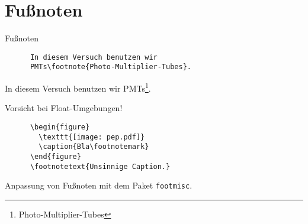 \section{Fußnoten}

\begin{frame}[fragile]{Fußnoten}
  \begin{CodeExample}{0.5}
    \begin{lstlisting}
      In diesem Versuch benutzen wir 
      PMTs\footnote{Photo-Multiplier-Tubes}.
    \end{lstlisting}
    \CodeResult
    In diesem Versuch benutzen wir PMTs\footnote{Photo-Multiplier-Tubes}.
  \end{CodeExample}

  \begin{alertblock}{Vorsicht bei Float-Umgebungen!}
    \begin{lstlisting}
      \begin{figure}
        \texttt{[image: pep.pdf]}
        \caption{Bla\footnotemark}
      \end{figure}
      \footnotetext{Unsinnige Caption.}
    \end{lstlisting}
  \end{alertblock}

  \vspace{5pt}
  Anpassung von Fußnoten mit dem Paket \texttt{footmisc}.
\end{frame}
